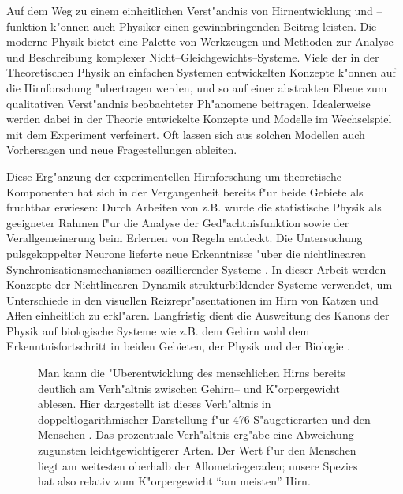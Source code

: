 Auf dem Weg zu einem einheitlichen Verst"andnis von Hirnentwicklung und
\mbox{--funktion} k"onnen auch Physiker einen gewinnbringenden Beitrag leisten.
Die moderne Physik bietet eine Palette von Werkzeugen und Methoden zur
Analyse und Beschreibung komplexer Nicht--Gleichgewichts--Systeme.  Viele
der in der Theoretischen Physik an einfachen Systemen entwickelten Konzepte
k"onnen auf die Hirnforschung "ubertragen werden, und so auf einer
abstrakten Ebene zum qualitativen Verst"andnis beobachteter Ph"anomene
beitragen. Idealerweise werden dabei in der Theorie entwickelte Konzepte
und Modelle im Wechselspiel mit dem Experiment verfeinert. Oft lassen sich
aus solchen Modellen auch Vorhersagen und neue Fragestellungen ableiten.

Diese Erg"anzung der experimentellen Hirnforschung um theoretische
Komponenten hat sich in der Vergangenheit bereits f"ur beide Gebiete als
fruchtbar erwiesen: Durch Arbeiten von 
z.B. wurde die statistische Physik als geeigneter Rahmen f"ur die Analyse
der Ged"achtnisfunktion sowie der Verallgemeinerung beim Erlernen von
Regeln entdeckt.  Die Untersuchung pulsgekoppelter Neurone lieferte neue
Erkenntnisse "uber die nichtlinearen Synchronisationsmechanismen
oszillierender Systeme .  In dieser
Arbeit werden Konzepte der Nichtlinearen Dynamik strukturbildender Systeme
verwendet, um Unterschiede in den visuellen Reizrepr"asentationen im Hirn
von Katzen und Affen einheitlich zu erkl"aren.  Langfristig dient die
Ausweitung des Kanons der Physik auf biologische Systeme wie z.B. dem
Gehirn wohl dem Erkenntnisfortschritt in beiden Gebieten, der Physik und
der Biologie \cite{braitenberg:1977}.

\begin{figure}[t]
\begin{center}
\end{center}
\caption{Man kann die "Uberentwicklung des menschlichen Hirns bereits
deutlich am Verh"altnis zwischen Gehirn-- und K"orpergewicht ablesen. Hier
dargestellt ist dieses Verh"altnis in doppeltlogarithmischer Darstellung
f"ur 476 S"augetierarten und den Menschen
\protect{}. Das prozentuale Verh"altnis erg"abe
eine Abweichung zugunsten leichtgewichtigerer Arten.  Der Wert f"ur den
Menschen liegt am weitesten oberhalb der Allometriegeraden; unsere Spezies
hat also relativ zum K"orpergewicht ``am meisten'' Hirn.}
\label{hirnmasse}
\end{figure}

